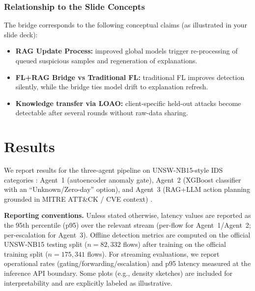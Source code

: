 \documentclass[conference]{IEEEtran}
\begin{document}
\subsubsection{Relationship to the Slide Concepts}
\label{sec:slide-mapping}

The bridge corresponds to the following conceptual claims (as illustrated in your slide deck):
\begin{itemize}
  \item \textbf{RAG Update Process:} improved global models trigger re-processing of queued suspicious samples and regeneration of explanations.
  \item \textbf{FL+RAG Bridge vs Traditional FL:} traditional FL improves detection silently, while the bridge ties model drift to explanation refresh.
  \item \textbf{Knowledge transfer via LOAO:} client-specific held-out attacks become detectable after several rounds without raw-data sharing.
\end{itemize}



\section{Results}
\label{sec:results}

We report results for the three-agent pipeline on UNSW-NB15-style IDS categories \cite{Moustafa2015UNSW}: Agent~1 (autoencoder anomaly gate), Agent~2 (XGBoost classifier with an ``Unknown/Zero-day'' option), and Agent~3 (RAG+LLM action planning grounded in MITRE ATT\&CK / CVE context) \cite{Chen2016XGBoost,Lewis2020RAG,MITREATTACK}.

\textbf{Reporting conventions.} Unless stated otherwise, latency values are reported as the 95th percentile (p95) over the relevant stream (per-flow for Agent~1/Agent~2; per-escalation for Agent~3). Offline detection metrics are computed on the official UNSW-NB15 testing split ($n=82{,}332$ flows) after training on the official training split ($n=175{,}341$ flows). For streaming evaluations, we report operational rates (gating/forwarding/escalation) and p95 latency measured at the inference API boundary. Some plots (e.g., density sketches) are included for interpretability and are explicitly labeled as illustrative.
\end{document}
